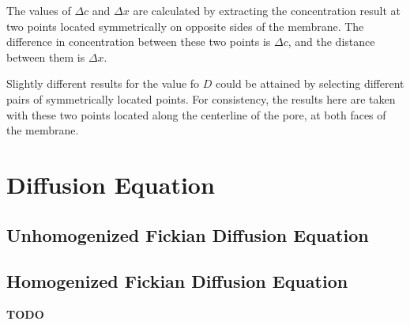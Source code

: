 \documentclass{article}
\begin{document}
The values of $\Delta c$ and $\Delta x$ are calculated by extracting
the concentration result at two points located symmetrically on opposite sides of the membrane.
The difference in concentration between these two points is $\Delta c$,
and the distance between them is $\Delta x$.

Slightly different results for the value fo $D$ could be attained by selecting different
pairs of symmetrically located points.
For consistency, the results here are taken with these two points located
along the centerline of the pore, at both faces of the membrane.


\section{Diffusion Equation}\label{sec:equation}

\subsection{Unhomogenized Fickian Diffusion Equation}\label{subsec:unhom_fick}



\subsection{Homogenized Fickian Diffusion Equation}\label{subsec:hom_fick}

\textbf{TODO}
\end{document}
